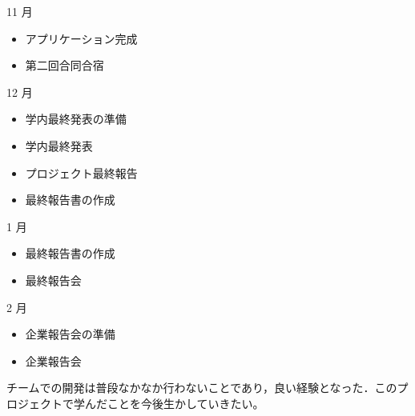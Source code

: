11 月
\begin{itemize}
\item アプリケーション完成
\item 第二回合同合宿
\end{itemize}
12 月
\begin{itemize}
\item 学内最終発表の準備
\item 学内最終発表
\item プロジェクト最終報告
\item 最終報告書の作成
\end{itemize}
1 月
\begin{itemize}
\item 最終報告書の作成
\item 最終報告会
\end{itemize}
2 月
\begin{itemize}
\item 企業報告会の準備
\item 企業報告会
\end{itemize}
\par チームでの開発は普段なかなか行わないことであり，良い経験となった．このプロジェクトで学んだことを今後生かしていきたい。
